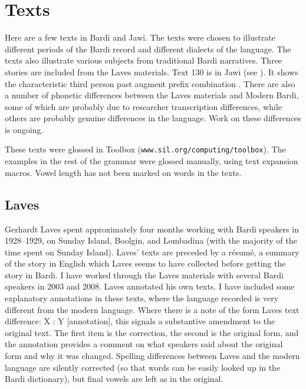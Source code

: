 \chapter{Texts}\label{texts}

\newcommand{\res}{}
\newcommand{\lnt}{\newline Laves' note: }
\newcommand{\llg}{\newline Laves text difference: }
\newcommand{\np}{}
\newcommand{\ph}{}
\newcommand{\nq}{Q: }
\renewcommand{\nt}{\newline Note: }
\newcommand{\fv}[1]{\mor{#1}}
\renewcommand{\uex}[1]{\textit{#1}\vspace*{1.5pt}}

Here are a few texts in Bardi and Jawi. The texts were chosen to illustrate different periods of the Bardi record and different dialects of the language. The texts also illustrate various subjects from traditional Bardi narratives. Three stories are included from the Laves materials. Text 130 is in Jawi (see ). It shows the characteristic third person past augment prefix combination . There are also a number of phonetic differences between the Laves materials and Modern Bardi, some of which are probably due to researcher transcription differences, while others are probably genuine differences in the language. Work on these differences is ongoing.

These texts were glossed in Toolbox (\texttt{\small www.sil.org/computing/toolbox}). The examples in the rest of the grammar were glossed manually, using text expansion macros. Vowel length has not been marked on words in the texts.

\section{Laves}
Gerhardt Laves spent approximately four months working with Bardi speakers in 1928--1929, on Sunday Island, Boolgin, and Lombadina (with the majority of the time spent on Sunday Island). Laves' texts are preceded by a r\'esum\'e, a summary of the story in English which Laves seems to have collected before getting the story in Bardi. I have worked through the Laves materials with several Bardi speakers in 2003 and 2008. Laves annotated his own texts. I have included some explanatory annotations in these texts, where the language recorded is very different from the modern language. Where there is a note of the form Laves text difference: X : Y [annotation], this signals a substantive amendment to the original text. The first item is the correction, the second is the original form, and the annotation provides a comment on what speakers said about the original form and why it was changed. Spelling differences between Laves and the modern language are silently corrected (so that words can be easily looked up in the Bardi dictionary), but final vowels are left as in the original.

